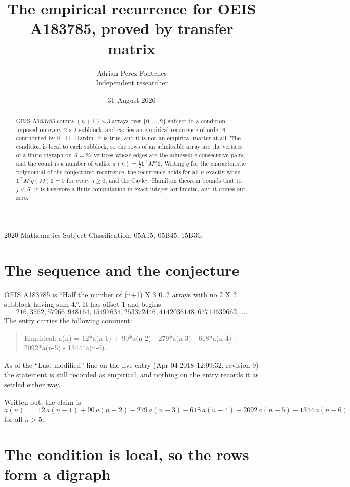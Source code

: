 \documentclass[11pt,a4paper]{article}
\title{The empirical recurrence for OEIS A183785, proved by transfer matrix}
\author{Adrian Perez Fontelles\\ \small Independent researcher}
\date{31 August 2026}
\theoremstyle{plain}
\theoremstyle{definition}
\begin{document}
\maketitle

\begin{abstract}
OEIS A183785 counts $(n+1)\times3$ arrays over $\{0,\dots,2\}$ subject to a condition imposed on
every $2\times2$ subblock, and carries an empirical recurrence of order $6$ contributed
by R.~H.~Hardin. It is true, and it is not an empirical matter at all. The condition is local
to each subblock, so the rows of an admissible array are the vertices of a finite digraph
on $S=27$ vertices whose edges are the admissible consecutive pairs, and the count is a
number of walks: $a(n)=\tfrac1{2}\mathbf{1}^{\!\top}M^{n}\mathbf{1}$. Writing $q$
for the characteristic polynomial of the conjectured recurrence, the recurrence holds for all
$n$ exactly when $\mathbf{1}^{\!\top}M^{j}q(M)\mathbf{1}=0$ for every $j\ge0$, and the
Cayley--Hamilton theorem bounds that to $j<S$. It is therefore a finite computation in exact
integer arithmetic, and it comes out zero.
\end{abstract}

\noindent\small 2020 Mathematics Subject Classification. 05A15, 05B45, 15B36.\normalsize

\section{The sequence and the conjecture}

OEIS A183785 is ``Half the number of (n+1) X 3 0..2 arrays with no 2 X 2 subblock having sum 4.''. It has offset $1$ and begins
\[
216, 3552, 57966, 948164, 15497634, 253372446, 4142036148, 67714639662,\ \dots
\]
The entry carries the following comment:
\begin{quote}\small
Empirical: a(n) = 12*a(n-1) + 90*a(n-2) - 279*a(n-3) - 618*a(n-4) + 2092*a(n-5) - 1344*a(n-6).
\end{quote}
As of the ``Last modified'' line on the live entry (Apr 04 2018 12:09:32, revision 9) the statement is
still recorded as empirical, and nothing on the entry records it as settled either way.

Written out, the claim is
\begin{equation}\label{eq:conj}
a(n)\;=\;12\,a(n-1) + 90\,a(n-2) - 279\,a(n-3) - 618\,a(n-4) + 2092\,a(n-5) - 1344\,a(n-6)
\end{equation}
for all $n>5$.

\section{The condition is local, so the rows form a digraph}
\end{document}

